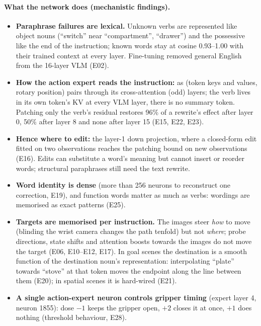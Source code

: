 \documentclass[11pt]{article}
\begin{document}
\paragraph{What the network does (mechanistic findings).}
\begin{itemize}
\item \textbf{Paraphrase failures are lexical.} Unknown verbs are represented like object nouns (``switch'' near ``compartment'',
``drawer'') and the possessive like the end of the instruction; known words stay at cosine 0.93--1.00 with their trained context at
every layer. Fine-tuning removed general English from the 16-layer VLM (E02).
\item \textbf{How the action expert reads the instruction:} as (token keys and values, rotary position) pairs through its
cross-attention (odd) layers; the verb lives in its own token's KV at every VLM layer, there is no summary token. Patching only the
verb's residual restores 96\% of a rewrite's effect after layer 0, 50\% after layer 8 and none after layer 15 (E15, E22, E23).
\item \textbf{Hence where to edit:} the layer-1 down projection, where a closed-form edit fitted on two observations reaches the
patching bound on new observations (E16). Edits can substitute a word's meaning but cannot insert or reorder words; structural
paraphrases still need the text rewrite.
\item \textbf{Word identity is dense} (more than 256 neurons to reconstruct one correction, E19), and function words matter as much
as verbs: wordings are memorised as exact patterns (E25).
\item \textbf{Targets are memorised per instruction.} The images steer \emph{how} to move (blinding the wrist camera changes the path
tenfold) but not \emph{where}; probe directions, state shifts and attention boosts towards the images do not move the target (E06,
E10--E12, E17). In goal scenes the destination is a smooth function of the destination noun's representation: interpolating
``plate'' towards ``stove'' at that token moves the endpoint along the line between them (E20); in spatial scenes it is hard-wired
(E21).
\item \textbf{A single action-expert neuron controls gripper timing} (expert layer 4, neuron 1855): dose $-1$ keeps the gripper open,
$+2$ closes it at once, $+1$ does nothing (threshold behaviour, E28).
\end{itemize}
\end{document}
